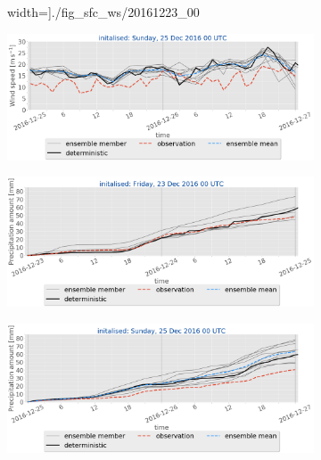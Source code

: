 \begin{figure}[H]
\begin{subfigure}[b]{0.49\textwidth}
		width=\textwidth]{./fig_sfc_ws/20161223_00}
		\caption{}\label{fig:res:sfc_ws23}
	\end{subfigure}
	\begin{subfigure}[b]{0.49\textwidth}
		\includegraphics[trim={0.cm 5.cm 0cm 0cm},clip,
		width=\textwidth]{./fig_sfc_ws/20161225_00}
		\caption{}\label{fig:res:sfc_ws25}
	\end{subfigure}
	\begin{subfigure}[b]{0.49\textwidth}
		\includegraphics[trim={0.cm 3.6cm 0cm 0cm},clip,
		width=\textwidth]{./fig_sfc_precip/20161223_00}
		\caption{}\label{fig:res:sfc_precip23}
	\end{subfigure}
	\begin{subfigure}[b]{0.49\textwidth}
		\includegraphics[trim={0.cm 3.6cm 0cm 0cm},clip,
		width=\textwidth]{./fig_sfc_precip/20161225_00}
		\caption{}\label{fig:res:sfc_precip25}
	\end{subfigure}
	

\end{figure}
